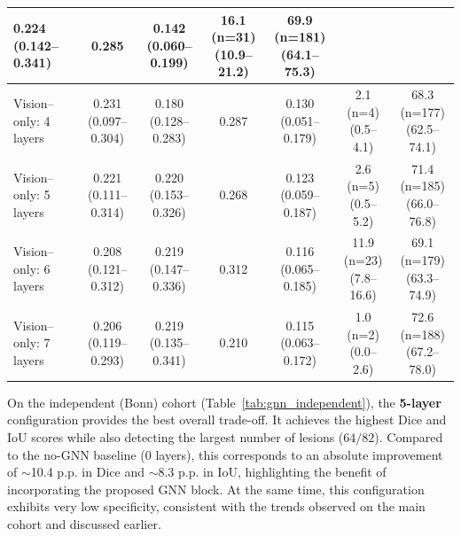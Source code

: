 \documentclass[FCD_GNN.tex]{subfiles}
\begin{document}
\begin{table}[ht]
\begin{tabular}{lcccccc}
\makecell{\colorbox{cyan!15}{0.224} \\ (0.142--0.341)} & 
0.285 & 
\makecell{\colorbox{green!15}{0.142} \\ (0.060--0.199)} & 
\makecell{16.1 (n=31) \\ (10.9--21.2)} &
\makecell{\colorbox{orange!15}{69.9 (n=181)} \\ (64.1--75.3)} \\
\hline
Vision--only: 4 layers  & 
\makecell{0.231 \\ (0.097--0.304)} & 
\makecell{0.180 \\ (0.128--0.283)} & 
0.287 & 
\makecell{0.130 \\ (0.051--0.179)} & 
\makecell{2.1 (n=4) \\ (0.5--4.1)} &
\makecell{68.3 (n=177) \\ (62.5--74.1)} \\
\hline
Vision--only: 5 layers  & 
\makecell{0.221 \\ (0.111--0.314)} & 
\makecell{\colorbox{orange!15}{0.220} \\ (0.153--0.326)} & 
0.268 & 
\makecell{0.123 \\ (0.059--0.187)} & 
\makecell{2.6 (n=5) \\ (0.5--5.2)} & 
\makecell{\colorbox{cyan!15}{71.4 (n=185)} \\ (66.0--76.8)} \\
\hline
Vision--only: 6 layers  & 
\makecell{0.208 \\ (0.121--0.312)} & 
\makecell{0.219 \\ (0.147--0.336)} & 
0.312 & 
\makecell{0.116 \\ (0.065--0.185)} & 
\makecell{11.9 (n=23) \\ (7.8--16.6)} &
\makecell{69.1 (n=179) \\ (63.3--74.9)} \\
\hline
Vision--only: 7 layers  & 
\makecell{0.206 \\ (0.119--0.293)} & 
\makecell{0.219 \\ (0.135--0.341)} & 
0.210 & 
\makecell{0.115 \\ (0.063--0.172)} & 
\makecell{1.0 (n=2) \\ (0.0--2.6)} & 
\makecell{\colorbox{green!15}{72.6 (n=188)} \\ (67.2--78.0)} \\
\hline
\end{tabular}
\end{table}

On the independent (Bonn) cohort (Table~\ref{tab:gnn_independent}), the \textbf{5-layer} configuration provides the best overall trade-off.
It achieves the highest Dice and IoU scores while also detecting the largest number of lesions (\(64/82\)).
Compared to the no-GNN baseline (0 layers), this corresponds to an absolute improvement of $\sim$10.4 \ac{p.p.} in Dice and $\sim$8.3 \ac{p.p.} in IoU, highlighting the benefit of incorporating the proposed GNN block.
At the same time, this configuration exhibits very low specificity, consistent with the trends observed on the main cohort and discussed earlier.
\end{document}
